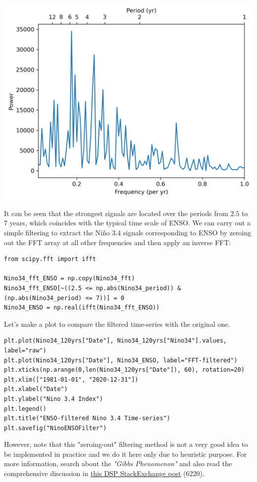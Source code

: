 \begin{center}
\includegraphics[scale=0.75]{graphics/NinoFFT.png}
\end{center}
It can be seen that the strongest signals are located over the periods from $2.5$ to $7$ years, which coincides with the typical time scale of ENSO. We can carry out a simple filtering to extract the Niño 3.4 signals corresponding to ENSO by zeroing out the FFT array at all other frequencies and then apply an inverse FFT: 
\begin{lstlisting}
from scipy.fft import ifft

Nino34_fft_ENSO = np.copy(Nino34_fft)
Nino34_fft_ENSO[~((2.5 <= np.abs(Nino34_period)) & (np.abs(Nino34_period) <= 7))] = 0
Nino34_ENSO = np.real(ifft(Nino34_fft_ENSO))
\end{lstlisting}
Let's make a plot to compare the filtered time-series with the original one.
\begin{lstlisting}
plt.plot(Nino34_120yrs["Date"], Nino34_120yrs["Nino34"].values, label="raw")
plt.plot(Nino34_120yrs["Date"], Nino34_ENSO, label="FFT-filtered")
plt.xticks(np.arange(0,len(Nino34_120yrs["Date"]), 60), rotation=20)
plt.xlim(["1981-01-01", "2020-12-31"])
plt.xlabel("Date")
plt.ylabel("Nino 3.4 Index")
plt.legend()
plt.title("ENSO-filtered Nino 3.4 Time-series")
plt.savefig("NinoENSOFilter")
\end{lstlisting}
However, note that this "zeroing-out" filtering method is not a very good idea to be implemented in practice and we do it here only due to heuristic purpose. For more information, search about the \textit{"Gibbs Phenomenon"} and also read the comprehensive discussion in   \href{https://stackoverflow.com/questions/31256252/why-does-numpy-linalg-solve-offer-more-precise-matrix-inversions-than-numpy-li}{this DSP StackExchange post} (6220).

